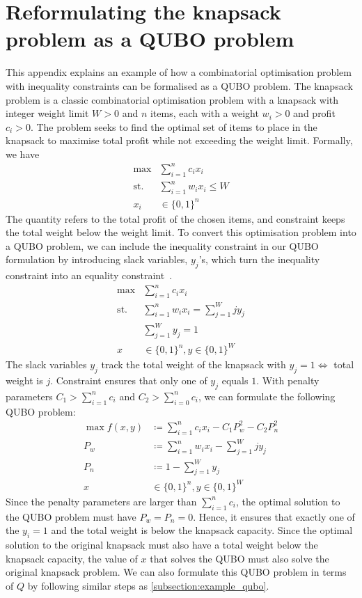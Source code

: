 \chapter{Reformulating the knapsack problem as a QUBO problem}\label{appendix:knapsack}

This appendix explains an example of how a combinatorial optimisation problem with inequality constraints can be formalised as a QUBO problem. The knapsack problem is a classic combinatorial optimisation problem with a knapsack with integer weight limit $W > 0$ and $n$ items, each with a weight $w_i > 0$ and profit $c_i > 0$. The problem seeks to find the optimal set of items to place in the knapsack to maximise total profit while not exceeding the weight limit. Formally, we have
\begin{align}
\max &\sum_{i=1}^n c_i x_i \label{eq:knapsack_cost}\\
\mathrm{st.} &\sum_{i=1}^n w_i x_i \leq W \label{eq:knapsack_constraint}\\
x_i &\in \{0,1\}^n \nonumber
\end{align}
The quantity  refers to the total profit of the chosen items, and constraint  keeps the total weight below the weight limit. To convert this optimisation problem into a QUBO problem, we can include the inequality constraint in our QUBO formulation by introducing slack variables, $y_j$'s, which turn the inequality constraint into an equality constraint~\cite{b6}.
\begin{align}
\max &\sum_{i=1}^n c_i x_i \\
\mathrm{st.} &\sum_{i=1}^n w_i x_i = \sum_{j=1}^W jy_j \label{eq:knapsack_slack_weight}\\
&\sum_{j=1}^W y_j = 1 \label{eq:knapsack_slack_sum}\\
x &\in \{0,1\}^n, y \in \{0,1\}^W \nonumber
\end{align}
The slack variables $y_j$ track the total weight of the knapsack with $y_j = 1 \Leftrightarrow$ total weight is $j$. Constraint  ensures that only one of $y_j$ equals $1$. With penalty parameters $C_1 > \sum_{i=1}^n c_i$ and $C_2 > \sum_{i=0}^n c_i$, we can formulate the following QUBO problem:
\begin{align}
    \max f(x, y) &\coloneqq \sum_{i=1}^n c_i x_i - C_1 P_w^2 - C_2 P_n^2 \\
    P_w &\coloneqq \sum_{i=1}^n w_i x_i - \sum_{j=1}^W jy_j \\
    P_n &\coloneqq 1 - \sum_{j=1}^W y_j \\
    x &\in \{0,1\}^n, y \in \{0,1\}^W \nonumber
\end{align}
Since the penalty parameters are larger than $\sum_{i=1}^n c_i$, the optimal solution to the QUBO problem must have $P_w = P_n = 0$. Hence, it ensures that exactly one of the $y_i=1$ and the total weight is below the knapsack capacity. Since the optimal solution to the original knapsack must also have a total weight below the knapsack capacity, the value of $x$ that solves the QUBO must also solve the original knapsack problem. We can also formulate this QUBO problem in terms of $Q$ by following similar steps as \autoref{subsection:example_qubo}.